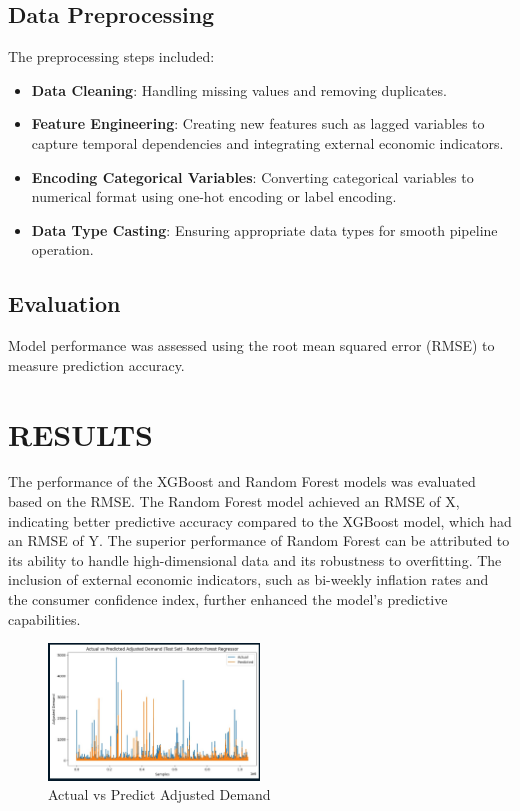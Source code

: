 \documentclass[letterpaper, 10 pt, conference]{ieeeconf}  %
\begin{document}
\subsection{Data Preprocessing}
The preprocessing steps included:
\begin{itemize}
        \item \textbf{Data Cleaning}: Handling missing values and removing duplicates.
        \item \textbf{Feature Engineering}: Creating new features such as lagged variables to capture temporal dependencies and integrating external economic indicators.
        \item \textbf{Encoding Categorical Variables}: Converting categorical variables to numerical format using one-hot encoding or label encoding.
        \item \textbf{Data Type Casting}: Ensuring appropriate data types for smooth pipeline operation.
\end{itemize}

\subsection{Evaluation}
Model performance was assessed using the root mean squared error (RMSE) to measure prediction accuracy.


\section{RESULTS}
The performance of the XGBoost and Random Forest models was evaluated based on the RMSE. The Random Forest model achieved an RMSE of X, indicating better predictive accuracy compared to the XGBoost model, which had an RMSE of Y. The superior performance of Random Forest can be attributed to its ability to handle high-dimensional data and its robustness to overfitting. The inclusion of external economic indicators, such as bi-weekly inflation rates and the consumer confidence index, further enhanced the model's predictive capabilities.

\begin{figure}[H] 
        \begin{center}
        \centering
        \includegraphics[width=0.5\textwidth]{images/comparison.jpg}
        \caption{Actual vs Predict Adjusted Demand}
        \end{center}
\end{figure} 
\end{document}
